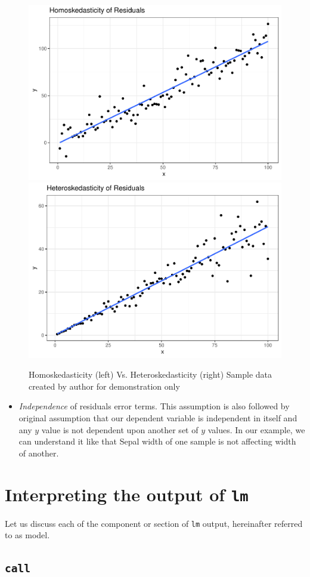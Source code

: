 \documentclass[
]{book}
\providecommand{\tightlist}{%
  \setlength{\itemsep}{0pt}\setlength{\parskip}{0pt}}
\begin{document}
\begin{figure}

{\centering \includegraphics[width=0.47\linewidth]{DauR_files/figure-latex/homod-1} \includegraphics[width=0.47\linewidth]{DauR_files/figure-latex/homod-2} 

}

\caption{Homoskedasticity (left) Vs. Heteroskedasticity (right)
Sample data created by author for demonstration only}\label{fig:homod}
\end{figure}

\begin{itemize}
\tightlist
\item
  \emph{Independence} of residuals error terms. This assumption is also followed by original assumption that our dependent variable is independent in itself and any \(y\) value is not dependent upon another set of \(y\) values. In our example, we can understand it like that Sepal width of one sample is not affecting width of another.
\end{itemize}

\hypertarget{interpreting-the-output-of-lm}{%
\section{\texorpdfstring{Interpreting the output of \texttt{lm}}{Interpreting the output of lm}}\label{interpreting-the-output-of-lm}}

Let us discuss each of the component or section of \texttt{lm} output, hereinafter referred to as model.

\hypertarget{call}{%
\subsection{\texorpdfstring{\texttt{call}}{call}}\label{call}}
\end{document}
